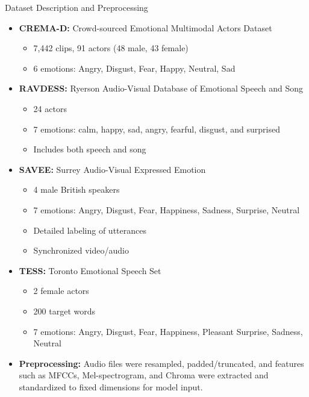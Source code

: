 \documentclass[final]{beamer}
\begin{document}
\begin{frame}[t]
\begin{minipage}[t]{0.28\textwidth}
    
\begin{block}{Dataset Description and Preprocessing}
\begin{itemize}
    \item \textbf{CREMA-D:} Crowd-sourced Emotional Multimodal Actors Dataset
    \begin{itemize}
        \item 7,442 clips, 91 actors (48 male, 43 female)
        \item 6 emotions: Angry, Disgust, Fear, Happy, Neutral, Sad
    \end{itemize}
    \item \textbf{RAVDESS:} Ryerson Audio-Visual Database of Emotional Speech and Song
    \begin{itemize}
        \item 24 actors
        \item 7 emotions: calm, happy, sad, angry, fearful, disgust, and surprised
        \item Includes both speech and song
    \end{itemize}
    \item \textbf{SAVEE:} Surrey Audio-Visual Expressed Emotion
    \begin{itemize}
        \item 4 male British speakers
        \item 7 emotions: Angry, Disgust, Fear, Happiness, Sadness, Surprise, Neutral
        \item Detailed labeling of utterances
        \item Synchronized video/audio
    \end{itemize}
    \item \textbf{TESS:} Toronto Emotional Speech Set
    \begin{itemize}
        \item 2 female actors
        \item 200 target words
        \item 7 emotions: Angry, Disgust, Fear, Happiness, Pleasant Surprise, Sadness, Neutral
    \end{itemize}
\end{itemize}


\begin{itemize}
    \item \textbf{Preprocessing:} Audio files were resampled, padded/truncated, and features such as MFCCs, Mel-spectrogram, and Chroma were extracted and standardized to fixed dimensions for model input.
\end{itemize}
\end{block}


\end{minipage}
\end{frame}
\end{document}
